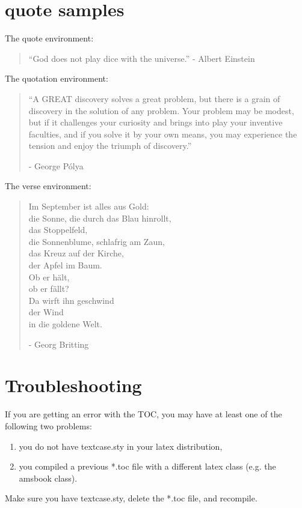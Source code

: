 \documentclass{iuphd}
\begin{document}
\section{quote samples}
The quote environment:
\begin{quote}
``God does not play dice with the universe.'' - Albert Einstein
\end{quote}
The quotation environment:
\begin{quotation}
 ``A GREAT discovery solves a great problem, but there is a grain of discovery in the solution of any problem.
 Your problem may be modest, but if it challenges your curiosity and brings into play your inventive faculties,
 and if you solve it by your own means, you may experience the tension and enjoy the triumph of discovery.''
 
 - George P\'olya
\end{quotation}
The verse environment:
\begin{verse}
Im September ist alles aus Gold:\\ 
die Sonne, die durch das Blau hinrollt,\\
das Stoppelfeld,\\
die Sonnenblume, schlafrig am Zaun,\\
das Kreuz auf der Kirche,\\
der Apfel im Baum.\\
Ob er h\"alt,\\
ob er f\"allt? \\
Da wirft ihn geschwind\\
der Wind\\
in die goldene Welt.

- Georg Britting
\end{verse}

\section{Troubleshooting}

If you are getting an error with the TOC, you may have at least one of the following two problems:
\begin{enumerate}
 \item you do not have textcase.sty in your latex distribution,
 \item you compiled a previous *.toc file with a different latex class (e.g. the amsbook class).
\end{enumerate}
Make sure you have textcase.sty, delete the *.toc file, and recompile.

\begin{comment}
 

\end{comment}
\printbibliography

%
\end{document}
